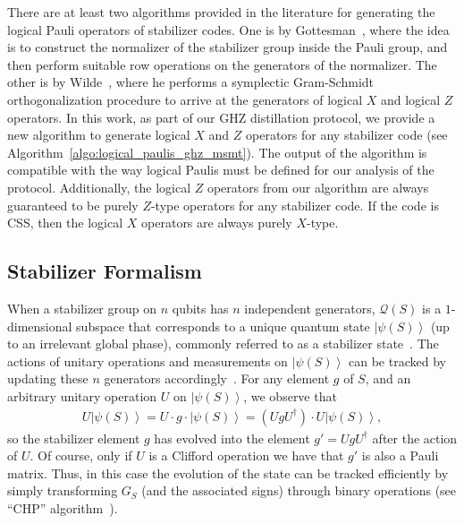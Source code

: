 \documentclass[journal,onecolumn]{IEEEtran}
\newcommand{\dket}[1]{\left\lvert #1 \right\rangle}
\begin{document}
There are at least two algorithms provided in the literature for generating the logical Pauli operators of stabilizer codes.
One is by Gottesman~\cite{Gottesman-phd97,Nielsen-2010}, where the idea is to construct the normalizer of the stabilizer group inside the Pauli group, and then perform suitable row operations on the generators of the normalizer.
The other is by Wilde~\cite{Wilde-physreva09}, where he performs a symplectic Gram-Schmidt orthogonalization procedure to arrive at the generators of logical $X$ and logical $Z$ operators.
In this work, as part of our GHZ distillation protocol, we provide a new algorithm to generate logical $X$ and $Z$ operators for any stabilizer code (see Algorithm~\ref{algo:logical_paulis_ghz_msmt}).
The output of the algorithm is compatible with the way logical Paulis must be defined for our analysis of the protocol.
Additionally, the logical $Z$ operators from our algorithm are always guaranteed to be purely $Z$-type operators for any stabilizer code.
If the code is CSS, then the logical $X$ operators are always purely $X$-type.



\subsection{Stabilizer Formalism}
\label{sec:stabilizer_formalism}


When a stabilizer group on $n$ qubits has $n$ independent generators, $\mathcal{Q}(S)$ is a $1$-dimensional subspace that corresponds to a unique quantum state $\dket{\psi(S)}$ (up to an irrelevant global phase), commonly referred to as a stabilizer state~\cite{Gottesman-phd97}.
The actions of unitary operations and measurements on $\dket{\psi(S)}$ can be tracked by updating these $n$ generators accordingly~\cite{Gottesman-icgtmp98,Aaronson-pra04}.
For any element $g$ of $S$, and an arbitrary unitary operation $U$ on $\dket{\psi(S)}$, we observe that
\begin{align}
U \dket{\psi(S)} = U \cdot g \cdot\dket{\psi(S)} = (UgU^\dagger) \cdot U \dket{\psi(S)},
\end{align}
so the stabilizer element $g$ has evolved into the element $g' = UgU^\dagger$ after the action of $U$.
Of course, only if $U$ is a Clifford operation we have that $g'$ is also a Pauli matrix.
Thus, in this case the evolution of the state can be tracked efficiently by simply transforming $G_S$ (and the associated signs) through binary operations (see ``CHP'' algorithm~\cite{Aaronson-pra04}).
\end{document}
